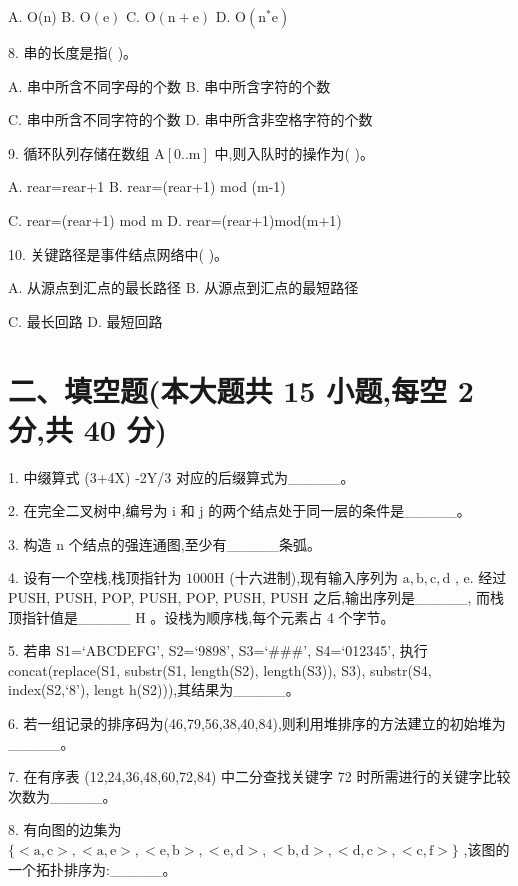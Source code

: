 A. O(n) B. \(\mathrm{O}\left( \mathrm{e}\right)\) C. \(\mathrm{O}\left( {\mathrm{n} + \mathrm{e}}\right)\) D. \(\mathrm{O}\left( {{\mathrm{n}}^{ * }\mathrm{e}}\right)\)

8. 串的长度是指(   )。

A. 串中所含不同字母的个数 B. 串中所含字符的个数

C. 串中所含不同字符的个数 D. 串中所含非空格字符的个数

9. 循环队列存储在数组 \(\mathrm{A}\left\lbrack  {0..\mathrm{m}}\right\rbrack\) 中,则入队时的操作为(   )。

A. rear=rear+1 B. rear=(rear+1) mod (m-1)

C. rear=(rear+1) mod m D. rear=(rear+1)mod(m+1)

10. 关键路径是事件结点网络中(   )。

A. 从源点到汇点的最长路径 B. 从源点到汇点的最短路径

C. 最长回路 D. 最短回路

\section*{二、填空题(本大题共 15 小题,每空 2 分,共 40 分)}

1. 中缀算式 (3+4X) -2Y/3 对应的后缀算式为\_\_\_\_\_。

2. 在完全二叉树中,编号为 \(\mathrm{i}\) 和 \(\mathrm{j}\) 的两个结点处于同一层的条件是\_\_\_\_\_。

3. 构造 n 个结点的强连通图,至少有\_\_\_\_\_条弧。

4. 设有一个空栈,栈顶指针为 \({1000}\mathrm{H}\) (十六进制),现有输入序列为 \(\mathrm{a},\mathrm{b},\mathrm{c},\mathrm{d}\) ,
e. 经过 PUSH, PUSH, POP, PUSH, POP, PUSH, PUSH 之后,输出序列是\_\_\_\_\_, 而栈顶指针值是\_\_\_\_\_ \(\mathrm{H}\) 。设栈为顺序栈,每个元素占 4 个字节。

5. 若串 S1=‘ABCDEFG’, S2=‘9898’, S3=‘\#\#\#’, S4=‘012345’, 执行 concat(replace(S1, substr(S1, length(S2), length(S3)), S3), substr(S4, index(S2,‘8’), lengt h(S2))),其结果为\_\_\_\_\_。

6. 若一组记录的排序码为(46,79,56,38,40,84),则利用堆排序的方法建立的初始堆为\_\_\_\_\_。

7. 在有序表 (12,24,36,48,60,72,84) 中二分查找关键字 72 时所需进行的关键字比较次数为\_\_\_\_\_。

8. 有向图的边集为 \(\{  < \mathrm{a},\mathrm{c} > , < \mathrm{a},\mathrm{e} > , < \mathrm{e},\mathrm{b} > , < \mathrm{e},\mathrm{d} > , < \mathrm{b},\mathrm{d} > , < \mathrm{d},\mathrm{c} > , < \mathrm{c},\mathrm{f} > \}\) ,该图的一个拓扑排序为:\_\_\_\_\_。

